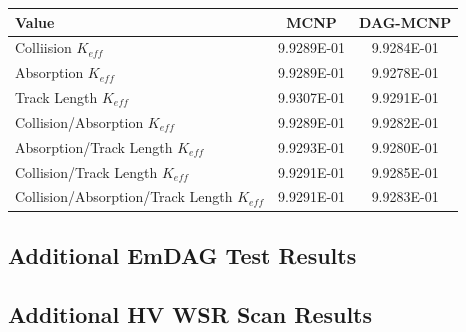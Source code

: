 \documentclass[10pt, a4paper]{article}
\begin{document}
\begin{table}[H]
  \centering
  \begin{tabular}{l c c}
    \toprule
    Value & MCNP & DAG-MCNP \\
    \hline
    Colliision $K_{eff}$ & 9.9289E-01 &  9.9284E-01 \\
    \hline
    Absorption $K_{eff}$ & 9.9289E-01 & 9.9278E-01 \\
    \hline
    Track Length $K_{eff}$ & 9.9307E-01 & 9.9291E-01 \\
    \hline
    Collision/Absorption $K_{eff}$ & 9.9289E-01 & 9.9282E-01 \\
    \hline
    Absorption/Track Length $K_{eff}$ & 9.9293E-01 & 9.9280E-01 \\
    \hline
    Collision/Track Length $K_{eff}$ & 9.9291E-01 & 9.9285E-01 \\
    \hline 
    Collision/Absorption/Track Length $K_{eff}$ & 9.9291E-01 & 9.9283E-01 \\
    \bottomrule    
  \end{tabular}
\end{table}

\subsection{Additional EmDAG Test Results}%

\subsection{Additional HV WSR Scan Results}%
\end{document}
